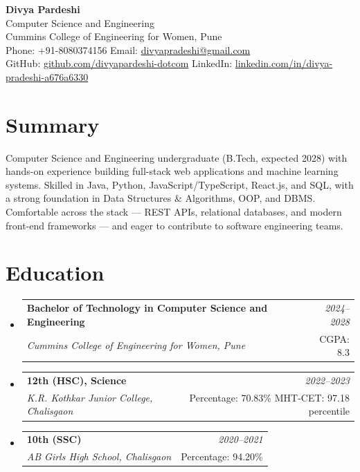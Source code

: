 \documentclass[a4paper,11pt]{article}
\makeatletter
\newcommand{\resumeSubheading}[4]{
\vspace{0.5mm}\item
    \begin{tabular*}{0.98\textwidth}[t]{l@{\extracolsep{\fill}}r}
        \textbf{#1} & \textit{\footnotesize{#4}} \\
        \textit{\footnotesize{#3}} &  \footnotesize{#2}\\
    \end{tabular*}
    \vspace{-2.4mm}
}
\newcommand{\resumeSubHeadingListStart}{\begin{itemize}[leftmargin=*,labelsep=0mm]}
\newcommand{\resumeSubHeadingListEnd}{\end{itemize}\vspace{2mm}}
\makeatother
\begin{document}
{\Large \textbf{Divya Pardeshi}}\\[2pt]
Computer Science and Engineering\\
Cummins College of Engineering for Women, Pune\\[2pt]
Phone: +91-8080374156 \quad\textbar\quad
Email: \href{mailto:divyapradeshi@gmail.com}{divyapradeshi@gmail.com}\\
GitHub: \href{https://github.com/divyapardeshi-dotcom}{github.com/divyapardeshi-dotcom} \quad\textbar\quad
LinkedIn: \href{https://www.linkedin.com/in/divya-pradeshi-a676a6330}{linkedin.com/in/divya-pradeshi-a676a6330}

\vspace{2mm}

\section{\textbf{Summary}}
\vspace{1mm}
\small{Computer Science and Engineering undergraduate (B.Tech, expected 2028) with hands-on experience building full-stack web applications and machine learning systems. Skilled in Java, Python, JavaScript/TypeScript, React.js, and SQL, with a strong foundation in Data Structures \& Algorithms, OOP, and DBMS. Comfortable across the stack — REST APIs, relational databases, and modern front-end frameworks — and eager to contribute to software engineering teams.}
\vspace{-1mm}

\section{\textbf{Education}}
\resumeSubHeadingListStart

\resumeSubheading
  {Bachelor of Technology in Computer Science and Engineering}{CGPA: 8.3}
  {Cummins College of Engineering for Women, Pune}{2024--2028}

\resumeSubheading
  {12th (HSC), Science}{Percentage: 70.83\% \quad MHT-CET: 97.18 percentile}
  {K.R. Kothkar Junior College, Chalisgaon}{2022--2023}

\resumeSubheading
  {10th (SSC)}{Percentage: 94.20\%}
  {AB Girls High School, Chalisgaon}{2020--2021}

\resumeSubHeadingListEnd
\vspace{-3mm}
\end{document}
